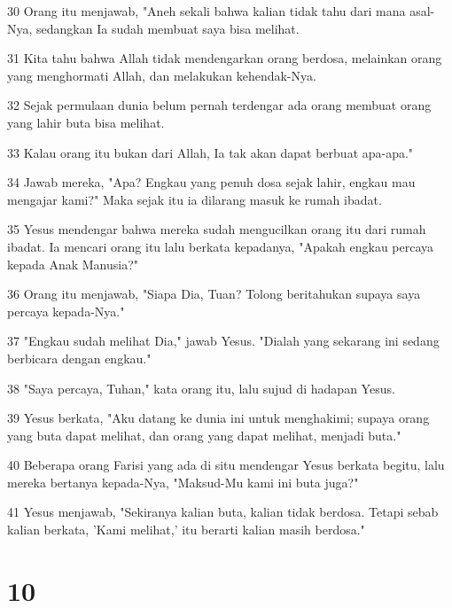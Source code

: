 \par 30 Orang itu menjawab, "Aneh sekali bahwa kalian tidak tahu dari mana asal-Nya, sedangkan Ia sudah membuat saya bisa melihat.
\par 31 Kita tahu bahwa Allah tidak mendengarkan orang berdosa, melainkan orang yang menghormati Allah, dan melakukan kehendak-Nya.
\par 32 Sejak permulaan dunia belum pernah terdengar ada orang membuat orang yang lahir buta bisa melihat.
\par 33 Kalau orang itu bukan dari Allah, Ia tak akan dapat berbuat apa-apa."
\par 34 Jawab mereka, "Apa? Engkau yang penuh dosa sejak lahir, engkau mau mengajar kami?" Maka sejak itu ia dilarang masuk ke rumah ibadat.
\par 35 Yesus mendengar bahwa mereka sudah mengucilkan orang itu dari rumah ibadat. Ia mencari orang itu lalu berkata kepadanya, "Apakah engkau percaya kepada Anak Manusia?"
\par 36 Orang itu menjawab, "Siapa Dia, Tuan? Tolong beritahukan supaya saya percaya kepada-Nya."
\par 37 "Engkau sudah melihat Dia," jawab Yesus. "Dialah yang sekarang ini sedang berbicara dengan engkau."
\par 38 "Saya percaya, Tuhan," kata orang itu, lalu sujud di hadapan Yesus.
\par 39 Yesus berkata, "Aku datang ke dunia ini untuk menghakimi; supaya orang yang buta dapat melihat, dan orang yang dapat melihat, menjadi buta."
\par 40 Beberapa orang Farisi yang ada di situ mendengar Yesus berkata begitu, lalu mereka bertanya kepada-Nya, "Maksud-Mu kami ini buta juga?"
\par 41 Yesus menjawab, "Sekiranya kalian buta, kalian tidak berdosa. Tetapi sebab kalian berkata, 'Kami melihat,' itu berarti kalian masih berdosa."

\chapter{10}

